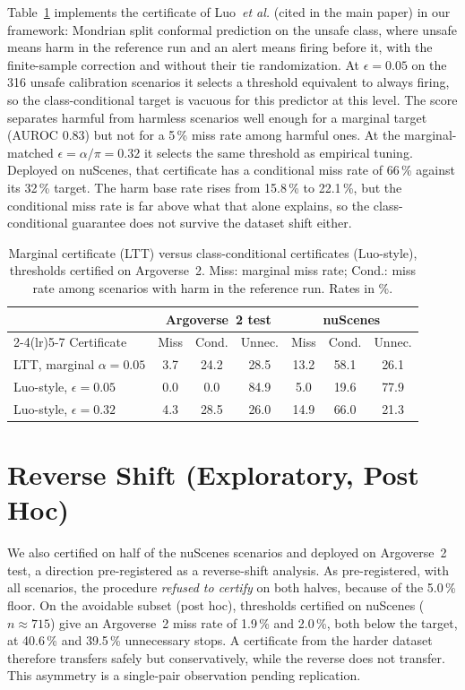 \documentclass[lettersize,journal]{IEEEtran}
\begin{document}
Table~\ref{tab:luoresult} implements the certificate of Luo~\emph{et al.}
(cited in the main paper) in our framework: Mondrian split conformal
prediction on the unsafe class, where unsafe means harm in the reference
run and an alert means firing before it, with the finite-sample
correction and without their tie randomization. At $\epsilon=0.05$ on the
316 unsafe calibration scenarios it selects a threshold equivalent to
always firing, so the class-conditional target is vacuous for this
predictor at this level. The score separates harmful from harmless
scenarios well enough for a marginal target (AUROC 0.83) but not for a
5\,\% miss rate among harmful ones. At the marginal-matched
$\epsilon=\alpha/\pi=0.32$ it selects the same threshold as empirical
tuning. Deployed on nuScenes, that certificate has a conditional miss
rate of 66\,\% against its 32\,\% target. The harm base rate rises from
15.8\,\% to 22.1\,\%, but the conditional miss rate is far above what that
alone explains, so the class-conditional guarantee does not survive the
dataset shift either.

\begin{table}[h]
\caption{Marginal certificate (LTT) versus class-conditional certificates
(Luo-style), thresholds certified on Argoverse~2. Miss: marginal miss
rate; Cond.: miss rate among scenarios with harm in the reference run.
Rates in \%.}
\label{tab:luoresult}
\centering
\scriptsize
\setlength{\tabcolsep}{3pt}
\begin{tabular}{lcccccc}
\toprule
 & \multicolumn{3}{c}{Argoverse~2 test} & \multicolumn{3}{c}{nuScenes} \\
\cmidrule(lr){2-4}\cmidrule(lr){5-7}
Certificate & Miss & Cond. & Unnec. & Miss & Cond. & Unnec. \\
\midrule
LTT, marginal $\alpha=0.05$ & 3.7 & 24.2 & 28.5 & 13.2 & 58.1 & 26.1 \\
Luo-style, $\epsilon=0.05$ & 0.0 & 0.0 & 84.9 & 5.0 & 19.6 & 77.9 \\
Luo-style, $\epsilon=0.32$ & 4.3 & 28.5 & 26.0 & 14.9 & 66.0 & 21.3 \\
\bottomrule
\end{tabular}
\end{table}

\section{Reverse Shift (Exploratory, Post Hoc)}
\label{sec:s-reverse}
We also certified on half of the nuScenes scenarios and deployed on
Argoverse~2 test, a direction pre-registered as a reverse-shift analysis.
As pre-registered, with all scenarios, the procedure \emph{refused to
certify} on both halves, because of the 5.0\,\% floor. On the avoidable
subset (post hoc), thresholds certified on nuScenes ($n\!\approx\!715$)
give an Argoverse~2 miss rate of 1.9\,\% and 2.0\,\%, both below the
target, at 40.6\,\% and 39.5\,\% unnecessary stops. A certificate from the
harder dataset therefore transfers safely but conservatively, while the
reverse does not transfer. This asymmetry is a single-pair observation
pending replication.
\end{document}
